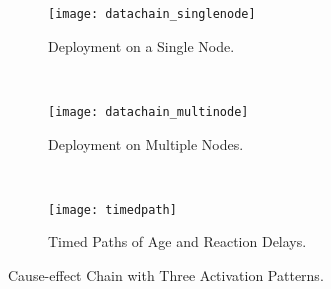 
\begin{figure*}[h!]
    \centering
    \begin{subfigure}[b]{0.25\textwidth}
    \texttt{[image: datachain\_singlenode]}
    \caption{Deployment on a Single Node.}
    \label{fig_datachainsingle}
    \end{subfigure}
    ~ %
    \begin{subfigure}[b]{0.365\textwidth}
    \texttt{[image: datachain\_multinode]}
    \caption{Deployment on Multiple Nodes.}
    \label{fig_datachainmulti}
    \end{subfigure}
   ~\vspace{-0.2cm}
    \begin{subfigure}[b]{0.35\textwidth}
    \texttt{[image: timedpath]}
    \caption{Timed Paths of Age and Reaction Delays.}
    \label{fig_timedpath}
    \end{subfigure}
    \caption{Cause-effect Chain with Three Activation Patterns.}
    \label{fig:datachain}
\end{figure*}

